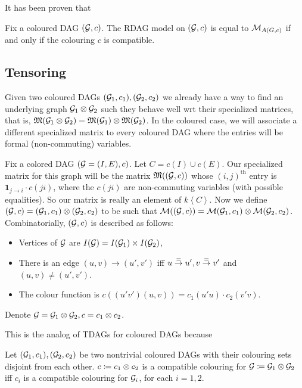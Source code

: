 It has been proven that 
\begin{prop}
Fix a coloured DAG $({\mathcal{G}},c)$. The RDAG model on $({\mathcal{G}},c)$ is equal to
${\mathcal{M}}_{A(G,c)}$ if and only if the colouring $c$ is compatible.
\end{prop}

\subsection{Tensoring}

Given two coloured DAGs $({\mathcal{G}}_1,c_1), ({\mathcal{G}}_2,c_2)$ we already have a way to find an underlying graph ${\mathcal{G}}_1\otimes {\mathcal{G}}_2$ such they behave well wrt their specialized matrices, that is, ${\mathfrak{M}}({\mathcal{G}}_1\otimes {\mathcal{G}}_2) = {\mathfrak{M}}({\mathcal{G}}_1)\otimes {\mathfrak{M}}({\mathcal{G}}_2)$. In the coloured case, we will associate a different specialized matrix to every coloured DAG where the entries will be formal (non-commuting) variables. 

Fix a colored DAG $({\mathcal{G}} = (I,E),c)$. Let $C = c(I)\cup c(E)$. Our specialized matrix for this graph will be the matrix ${\mathfrak{M}}(({\mathcal{G}},c))$ whose $(i,j)^{\text{th}}$ entry is $\pmb 1_{j\to i}\cdot c(ji)$, where the $c(ji)$ are non-commuting variables (with possible equalities). So our matrix is really an element of $k\left<C\right>$. Now we define $({\mathcal{G}},c) = ({\mathcal{G}}_1,c_1)\otimes ({\mathcal{G}}_2,c_2)$ to be such that ${\mathcal{M}}(({\mathcal{G}},c)) = {\mathcal{M}}({\mathcal{G}}_1,c_1)\otimes {\mathcal{M}}({\mathcal{G}}_2,c_2)$. Combinatorially, $({\mathcal{G}},c)$ is described as follows:
\begin{itemize}[itemsep=0pt]
\item Vertices of ${\mathcal{G}}$ are $I({\mathcal{G}})= I({\mathcal{G}}_1)\times I({\mathcal{G}}_2)$,
\item There is an edge $(u,v)\to (u',v')$ iff $u\stackrel{=}{\to} u', v\stackrel{=}{\to} v'$ and $(u,v)\neq (u',v')$.
\item The colour function is $c((u'v')(u,v)) = c_1(u'u)\cdot c_2(v'v)$.
\end{itemize}
Denote ${\mathcal{G}} = {\mathcal{G}}_1\otimes {\mathcal{G}}_2, c=c_1\otimes c_2$.

This is the analog of TDAGs for coloured DAGs because 
\begin{prop}
Let $({\mathcal{G}}_1,c_1), ({\mathcal{G}}_2,c_2)$ be two nontrivial coloured DAGs with their colouring sets disjoint from each other. $c\coloneqq c_1\otimes c_2$ is a compatible colouring for ${\mathcal{G}}\coloneqq {\mathcal{G}}_1\otimes {\mathcal{G}}_2$ iff $c_i$ is a compatible colouring for ${\mathcal{G}}_i$, for each $i=1,2$.
\end{prop}

